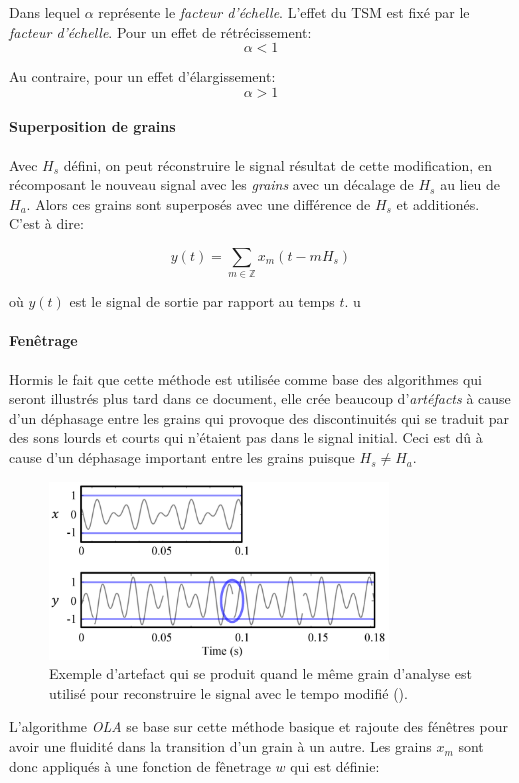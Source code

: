 \documentclass[letterpaper]{article}
\begin{document}
Dans lequel $\alpha$ représente le \emph{facteur d'échelle}.
L'effet du TSM est fixé par le \emph{facteur d'échelle}. Pour un effet de rétrécissement:
$$\alpha < 1$$

Au contraire, pour un effet d'élargissement:
$$\alpha > 1$$

\paragraph{Superposition de grains}

Avec $H_{s}$ défini, on peut réconstruire le signal résultat de cette modification, en récomposant
le nouveau signal avec les \emph{grains} avec un décalage de $H_{s}$ au lieu de $H_{a}$. Alors ces
grains sont superposés avec une différence de $H_{s}$ et additionés. C'est à dire:

$$ y(t) = \sum_{m \in \mathbb{Z}} x_{m}(t-mH_{s})$$

où $y(t)$ est le signal de sortie par rapport au temps $t$.
u
\paragraph {Fenêtrage}

Hormis le fait que cette méthode est utilisée comme base des algorithmes qui seront illustrés plus
tard dans ce document, elle crée beaucoup d'\emph{artéfacts} à cause d'un déphasage entre les
grains qui provoque des discontinuités qui se traduit par des sons lourds et courts qui n'étaient pas
dans le signal initial. Ceci est dû à cause d'un déphasage important entre les grains
puisque $H_{s} \neq H_{a}$.

\begin{figure}[h]
    \centerline{\includegraphics[width=9cm]{res/artifact.png}}
    \caption{\label{fig:artifact}Exemple d'artefact qui se produit quand le même grain d'analyse est
      utilisé pour reconstruire le signal avec le tempo modifié (\cite{TSMreview}). }
  \end{figure}
  
L'algorithme \emph{OLA} se base sur cette méthode basique et rajoute des fénêtres pour avoir une
fluidité dans la transition d'un grain à un autre. Les grains $x_m$ sont donc appliqués à une fonction
de fênetrage $w$ qui est définie:
\end{document}
